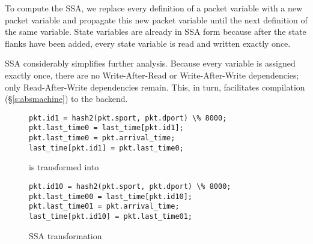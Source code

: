 To compute the SSA, we replace every definition of a packet variable with a new
packet variable and propagate this new packet variable until the next
definition of the same variable. State variables are already in SSA form
because after the state flanks have been added, every state variable is read
and written exactly once.

SSA considerably simplifies further analysis. Because every variable is
assigned exactly once, there are no Write-After-Read or Write-After-Write
dependencies; only Read-After-Write dependencies remain. This, in turn,
facilitates compilation (\S\ref{s:absmachine}) to the backend.
\begin{figure}
\begin{tiny}
\begin{lstlisting}
pkt.id1 = hash2(pkt.sport, pkt.dport) \% 8000;
pkt.last_time0 = last_time[pkt.id1];
pkt.last_time0 = pkt.arrival_time;
last_time[pkt.id1] = pkt.last_time0;
\end{lstlisting}
\end{tiny}
\begin{center}
is transformed into
\end{center}
\begin{tiny}
\begin{lstlisting}
pkt.id10 = hash2(pkt.sport, pkt.dport) \% 8000;
pkt.last_time00 = last_time[pkt.id10];
pkt.last_time01 = pkt.arrival_time;
last_time[pkt.id10] = pkt.last_time01;
\end{lstlisting}
\end{tiny}
\caption{SSA transformation}
\label{fig:stateful_flanks}
\end{figure}


